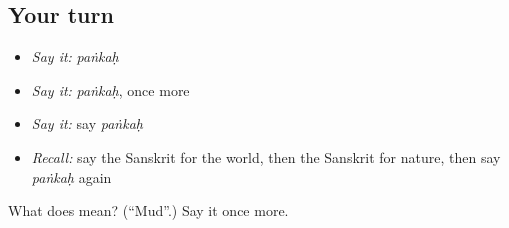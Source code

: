 \subsection*{Your turn}
\begin{itemize}
\raggedright
  \item \emph{Say it:} \emph{paṅkaḥ}
  \item \emph{Say it:} \emph{paṅkaḥ}, once more
  \item \emph{Say it:} say \emph{paṅkaḥ}
  \item \emph{Recall:} say the Sanskrit for the world, then the Sanskrit for nature, then say \emph{paṅkaḥ} again
\end{itemize}

\begin{tcolorbox}[breakable,colback=teal!4,colframe=teal!35!black,title={Before you move on}]
What does  mean? (\textquotedblleft{}Mud\textquotedblright{}.) Say it once more.
\end{tcolorbox}
